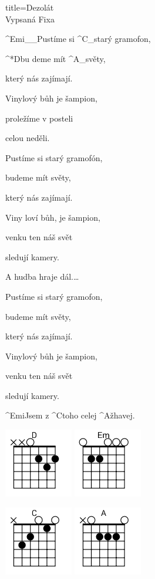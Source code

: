 \begin{song}{title=\predtitle\centering Dezolát\\\large Vypsaná Fixa \vspace*{-0.3cm}}
\begin{centerjustified}
\begin{varwidth}[t]{0.48\textwidth}
\sloka  %
	^{Emi{\color{white}\_\_}}Pustíme si ^{C{\color{white}\_}}starý gramofon,
	
	^*{D}bu deme mít ^{A{\color{white}\_}}světy, 
	
	který nás zajímají.
	
	Vinylový bůh je šampion,
	
	proležíme v posteli
	
	celou neděli.
	
	Pustíme si starý gramofón,
	
	budeme mít světy,
	
	který nás zajímají.
	
	Viny loví bůh, je šampion,
	
	venku ten náš svět 
	
	sledují kamery.
	
	\phantom{h}
	
	A hudba hraje dál.\elipsa\dots
	
	\phantom{h}	
	
	Pustíme si starý gramofon,
	
	budeme mít světy,
	
	který nás zajímají.
	
	Vinylový bůh je šampion,
	
	venku ten náš svět
	
	sledují kamery.
	
	\phantom{j}
	
	^{Emi}Jsem z ^{C}toho celej ^{A}žhavej.
	
\includegraphics[width=3cm]{../Akordy/d.png}
\includegraphics[width=3cm]{../Akordy/em.png}

\includegraphics[width=3cm]{../Akordy/c.png}
\includegraphics[width=3cm]{../Akordy/a.png}
	

\end{varwidth}
\end{centerjustified}
\end{song}
